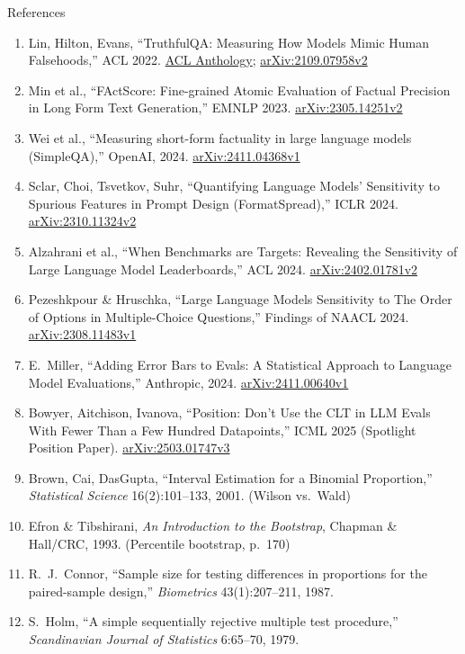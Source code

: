\begin{frame}[allowframebreaks]{References}
\begin{enumerate}
    \item Lin, Hilton, Evans, ``TruthfulQA: Measuring How Models Mimic Human Falsehoods,'' ACL 2022. \href{https://aclanthology.org/2022.acl-long.229/}{ACL Anthology}; \href{https://arxiv.org/abs/2109.07958v2}{arXiv:2109.07958v2}
    \item Min et al., ``FActScore: Fine-grained Atomic Evaluation of Factual Precision in Long Form Text Generation,'' EMNLP 2023. \href{https://arxiv.org/abs/2305.14251v2}{arXiv:2305.14251v2}
    \item Wei et al., ``Measuring short-form factuality in large language models (SimpleQA),'' OpenAI, 2024. \href{https://arxiv.org/abs/2411.04368v1}{arXiv:2411.04368v1}
    \item Sclar, Choi, Tsvetkov, Suhr, ``Quantifying Language Models' Sensitivity to Spurious Features in Prompt Design (FormatSpread),'' ICLR 2024. \href{https://arxiv.org/abs/2310.11324v2}{arXiv:2310.11324v2}
    \item Alzahrani et al., ``When Benchmarks are Targets: Revealing the Sensitivity of Large Language Model Leaderboards,'' ACL 2024. \href{https://arxiv.org/abs/2402.01781v2}{arXiv:2402.01781v2}
    \item Pezeshkpour \& Hruschka, ``Large Language Models Sensitivity to The Order of Options in Multiple-Choice Questions,'' Findings of NAACL 2024. \href{https://arxiv.org/abs/2308.11483v1}{arXiv:2308.11483v1}
    \item E.~Miller, ``Adding Error Bars to Evals: A Statistical Approach to Language Model Evaluations,'' Anthropic, 2024. \href{https://arxiv.org/abs/2411.00640v1}{arXiv:2411.00640v1}
    \item Bowyer, Aitchison, Ivanova, ``Position: Don't Use the CLT in LLM Evals With Fewer Than a Few Hundred Datapoints,'' ICML 2025 (Spotlight Position Paper). \href{https://arxiv.org/abs/2503.01747v3}{arXiv:2503.01747v3}
    \item Brown, Cai, DasGupta, ``Interval Estimation for a Binomial Proportion,'' \textit{Statistical Science} 16(2):101--133, 2001. (Wilson vs.\ Wald)
    \item Efron \& Tibshirani, \textit{An Introduction to the Bootstrap}, Chapman \& Hall/CRC, 1993. (Percentile bootstrap, p.~170)
    \item R.~J.~Connor, ``Sample size for testing differences in proportions for the paired-sample design,'' \textit{Biometrics} 43(1):207--211, 1987.
    \item S.~Holm, ``A simple sequentially rejective multiple test procedure,'' \textit{Scandinavian Journal of Statistics} 6:65--70, 1979.

\end{enumerate}
\end{frame}
